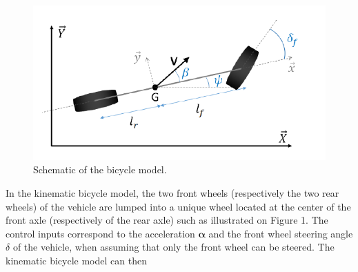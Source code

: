 \begin{figure}[!htb]
\begin{center}
\includegraphics[scale=0.290]{img/model_automotive_sys/bicycle_model_1.jpeg}
\end{center}
\caption{Schematic of the bicycle model.}
\label{bicycle_model_1}
\end{figure}


In the kinematic bicycle model, the two front wheels (respectively the two rear wheels) of the vehicle are lumped into a unique
wheel  located  at  the  center  of  the  front  axle  (respectively  of  the rear axle) such as illustrated on Figure 1. 
The control inputs correspond to the acceleration $\boldsymbol{\alpha}$ and the front wheel steering angle $\delta$
of  the  vehicle,  when  assuming  that  only  the  front wheel can be steered. The kinematic bicycle model can then


